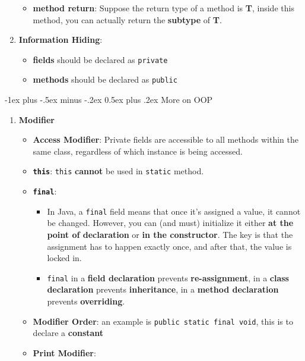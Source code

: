 \documentclass[10pt, landscape]{article}
\makeatletter
\renewcommand{\section}{\@startsection{section}{1}{0mm}%
                                {-1ex plus -.5ex minus -.2ex}%
                                {0.5ex plus .2ex}%
                                {\normalfont\large\bfseries}}
\makeatother
\begin{document}
\begin{multicols}{4}
\begin{enumerate}
\begin{itemize}
        \item \textbf{method return}: Suppose the return type of a method is \textbf{T}, inside this method, you can actually return the \textbf{subtype} of \textbf{T}.
    \end{itemize}
    \item \textbf{Information Hiding}:
    \begin{itemize}
        \item \textbf{fields} should be declared as \texttt{private}
        \item \textbf{methods} should be declared as \texttt{public}
    \end{itemize}
\end{enumerate}

\section{More on OOP}
\begin{enumerate}
    \item \textbf{Modifier}
    \begin{itemize}
        \item \textbf{Access Modifier}: Private fields are accessible to all methods within the same class, regardless of which instance is being accessed.
        \item \textbf{\texttt{this}}: \texttt{this} \textbf{cannot} be used in \texttt{static} method.
        \item \textbf{\texttt{final}}: 
        \begin{itemize}
            \item In Java, a \texttt{final} field means that once it’s assigned a value, it cannot be changed. However, you can (and must) initialize it either \textbf{at the point of declaration} or \textbf{in the constructor}. The key is that the assignment has to happen exactly once, and after that, the value is locked in.
            \item \texttt{final} in a \textbf{field declaration} prevents \textbf{re-assignment}, in a \textbf{class declaration} prevents \textbf{inheritance}, in a \textbf{method declaration} prevents \textbf{overriding}.
        \end{itemize}
        \item \textbf{Modifier Order}: an example is \texttt{public static final void}, this is to declare a \textbf{constant}
        \item \textbf{Print Modifier}: \\

\end{itemize}
\end{enumerate}
\end{multicols}
\end{document}
